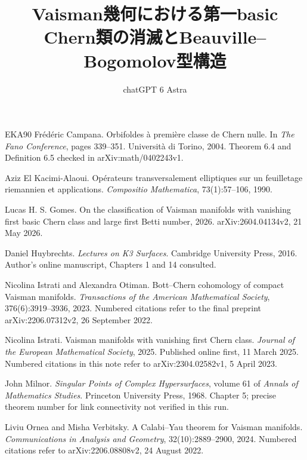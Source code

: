 \documentclass[12pt]{amsart}
\makeatletter
\theoremstyle{definition}
\theoremstyle{remark}
\numberwithin{equation}{section}
\let\MergeSetAbstract\@setabstract
\let\MergeSectionNumber\thesection
\let\MergeSectionName\sectionname
\let\MergeHSection\theHsection
\let\MergeChapterApp\Hy@chapapp
\newcommand{\MergeLanguage}{en}
\def\MergeResetCounters{}%
\newcommand{\MergeStart}[1]{%
  \def\MergeLanguage{#1}%
  \MergeResetCounters
  \let\thesection\MergeSectionNumber
  \let\sectionname\MergeSectionName
  \let\theHsection\MergeHSection
  \global\let\Hy@chapapp\MergeChapterApp
  \global\let\@setabstract\MergeSetAbstract
  \global\let\authors\@empty
  \gdef\shortauthors{chatGPT 6 Astra}%
  \global\let\addresses\@empty
}
\makeatother
\begin{document}
\clearpage
\begin{thebibliography}{EKA90}
Frédéric Campana. Orbifoldes à première classe de Chern nulle. In \emph{The Fano Conference}, pages 339--351. Università di Torino, 2004. Theorem 6.4 and Definition 6.5 checked in arXiv:math/0402243v1.

Aziz El Kacimi-Alaoui. Opérateurs transversalement elliptiques sur un feuilletage riemannien et applications. \emph{Compositio Mathematica}, 73(1):57--106, 1990.

Lucas H. S. Gomes. On the classification of Vaisman manifolds with vanishing first basic Chern class and large first Betti number, 2026. arXiv:2604.04134v2, 21 May 2026.

Daniel Huybrechts. \emph{Lectures on K3 Surfaces}. Cambridge University Press, 2016. Author's online manuscript, Chapters 1 and 14 consulted.

Nicolina Istrati and Alexandra Otiman. Bott--Chern cohomology of compact Vaisman manifolds. \emph{Transactions of the American Mathematical Society}, 376(6):3919--3936, 2023. Numbered citations refer to the final preprint arXiv:2206.07312v2, 26 September 2022.

Nicolina Istrati. Vaisman manifolds with vanishing first Chern class. \emph{Journal of the European Mathematical Society}, 2025. Published online first, 11 March 2025. Numbered citations in this note refer to arXiv:2304.02582v1, 5 April 2023.

John Milnor. \emph{Singular Points of Complex Hypersurfaces}, volume 61 of \emph{Annals of Mathematics Studies}. Princeton University Press, 1968. Chapter 5; precise theorem number for link connectivity not verified in this run.

Liviu Ornea and Misha Verbitsky. A Calabi--Yau theorem for Vaisman manifolds. \emph{Communications in Analysis and Geometry}, 32(10):2889--2900, 2024. Numbered citations refer to arXiv:2206.08808v2, 24 August 2022.

\end{thebibliography}



\newpage
\clearpage
\endgroup

\begingroup
\MergeStart{ja}
\title[Vaisman多様体の第一basic Chern類と構造]{Vaisman幾何における第一basic Chern類の消滅とBeauville--Bogomolov型構造}
\author{chatGPT 6 Astra}
\end{document}
